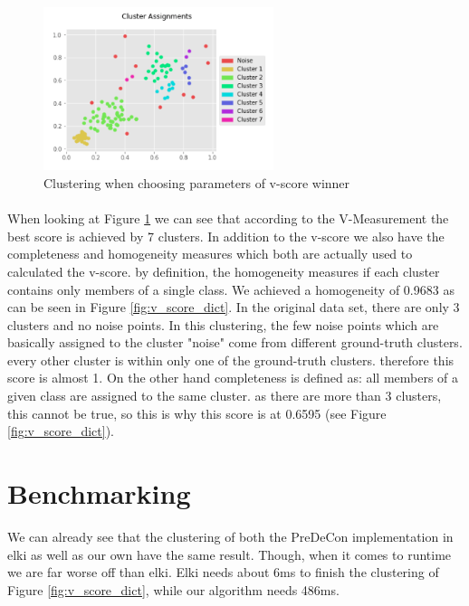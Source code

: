 \documentclass[a4paper]{article}
\begin{document}
\begin{figure}
	\centering
	\includegraphics[width=0.6\textwidth]{v_score_graph.png}
	\caption{Clustering when choosing parameters of v-score winner}
    \label{fig:v_score_graph}
\end{figure}
\paragraph{}
When looking at Figure \ref{fig:v_score_graph} we can see that according to the V-Measurement the best score is achieved by 7 clusters. In addition to the v-score we also have the completeness and homogeneity measures which both are actually used to calculated the v-score. by definition, the homogeneity measures if each cluster contains only members of a single class. We achieved a homogeneity of 0.9683 as can be seen in Figure \ref{fig:v_score_dict}. In the original data set, there are only 3 clusters and no noise points. In this clustering, the few noise points which are basically assigned to the cluster "noise" come from different ground-truth clusters. every other cluster is within only one of the ground-truth clusters. therefore this score is almost 1. On the other hand completeness is defined as: all members of a given class are assigned to the same cluster. as there are more than 3 clusters, this cannot be true, so this is why this score is at 0.6595 (see Figure \ref{fig:v_score_dict}).

\section{Benchmarking}
We can already see that the clustering of both the PreDeCon implementation in elki as well as our own have the same result. Though, when it comes to runtime we are far worse off than elki. Elki needs about 6ms to finish the clustering of Figure \ref{fig:v_score_dict}, while our algorithm needs 486ms.



\end{document}
